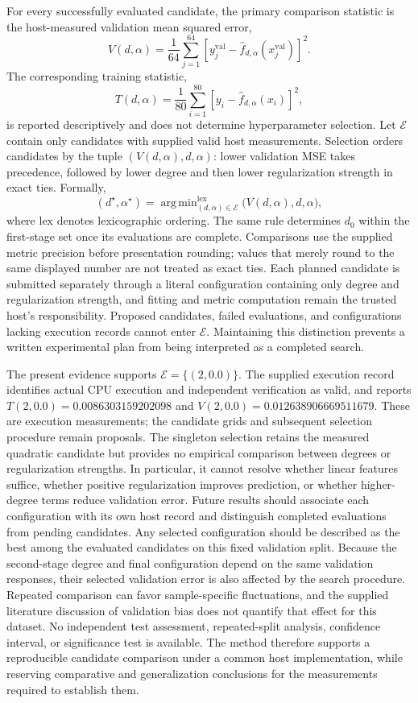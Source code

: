 \documentclass[11pt]{article}
\begin{document}
For every successfully evaluated candidate, the primary comparison statistic is the host-measured validation mean squared error,
\[
V(d,\alpha)
=
\frac{1}{64}
\sum_{j=1}^{64}
\left[
y_j^{\mathrm{val}}
-
\widehat f_{d,\alpha}(x_j^{\mathrm{val}})
\right]^2.
\]
The corresponding training statistic,
\[
T(d,\alpha)
=
\frac{1}{80}
\sum_{i=1}^{80}
\left[y_i-\widehat f_{d,\alpha}(x_i)\right]^2,
\]
is reported descriptively and does not determine hyperparameter selection. Let \(\mathcal{E}\) contain only candidates with supplied valid host measurements. Selection orders candidates by the tuple \((V(d,\alpha),d,\alpha)\): lower validation MSE takes precedence, followed by lower degree and then lower regularization strength in exact ties. Formally,
\[
(d^\star,\alpha^\star)
=
\mathop{\operatorname{arg\,min}}_{(d,\alpha)\in\mathcal{E}}^{\mathrm{lex}}
\bigl(V(d,\alpha),d,\alpha\bigr),
\]
where \(\mathrm{lex}\) denotes lexicographic ordering. The same rule determines \(d_0\) within the first-stage set once its evaluations are complete. Comparisons use the supplied metric precision before presentation rounding; values that merely round to the same displayed number are not treated as exact ties. Each planned candidate is submitted separately through a literal configuration containing only degree and regularization strength, and fitting and metric computation remain the trusted host's responsibility. Proposed candidates, failed evaluations, and configurations lacking execution records cannot enter \(\mathcal{E}\). Maintaining this distinction prevents a written experimental plan from being interpreted as a completed search.

The present evidence supports \(\mathcal{E}=\{(2,0.0)\}\). The supplied execution record identifies actual CPU execution and independent verification as valid, and reports \(T(2,0.0)=0.0086303159202098\) and \(V(2,0.0)=0.012638906669511679\). These are execution measurements; the candidate grids and subsequent selection procedure remain proposals. The singleton selection retains the measured quadratic candidate but provides no empirical comparison between degrees or regularization strengths. In particular, it cannot resolve whether linear features suffice, whether positive regularization improves prediction, or whether higher-degree terms reduce validation error. Future results should associate each configuration with its own host record and distinguish completed evaluations from pending candidates. Any selected configuration should be described as the best among the evaluated candidates on this fixed validation split. Because the second-stage degree and final configuration depend on the same validation responses, their selected validation error is also affected by the search procedure. Repeated comparison can favor sample-specific fluctuations, and the supplied literature discussion of validation bias does not quantify that effect for this dataset. No independent test assessment, repeated-split analysis, confidence interval, or significance test is available. The method therefore supports a reproducible candidate comparison under a common host implementation, while reserving comparative and generalization conclusions for the measurements required to establish them.
\end{document}
